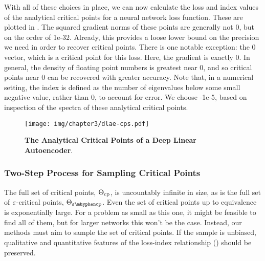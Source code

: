 \documentclass[../../thesis.tex]{subfiles}
\begin{document}
With all of these choices in place,
we can now calculate the loss and index values of the analytical
critical points for a neural network loss function.
These are plotted in .
The squared gradient norms of these points are generally not $0$,
but on the order of 1e-32.
Already, this provides a loose lower bound on the precision we need
in order to recover critical points.
There is one notable exception:
the $0$ vector, which is a critical point for this loss.
Here, the gradient is exactly $0$.
In general, the density of floating point numbers is greatest near $0$,
and so critical points near $0$ can be recovered with greater accuracy.
Note that, in a numerical setting,
the index is defined as the number of eigenvalues
below some small negative value, rather than $0$,
to account for error.
We choose -1e-5,
based on inspection of the spectra of these
analytical critical points.

\begin{figure}[h]
	\begin{center}
		\texttt{[image: img/chapter3/dlae-cps.pdf]}
	\end{center}
	\caption{\textbf{The Analytical Critical Points
	of a Deep Linear Autoencoder}.}
\end{figure}

\subsubsection{Two-Step Process for Sampling Critical Points}%

The full set of critical points, $\Theta_{\mathrm{cp}}$,
is uncountably infinite in size,
as is the full set of $\varepsilon$-critical points,
$\Theta_{\ecp}$.
Even the set of critical points up to equivalence is exponentially large.
For a problem as small as this one, it might be feasible to find all of them,
but for larger networks this won't be the case.
Instead, our methods must aim to sample the set of critical points.
If the sample is unbiased, qualitative and quantitative features
of the loss-index relationship
()
should be preserved.
\end{document}
